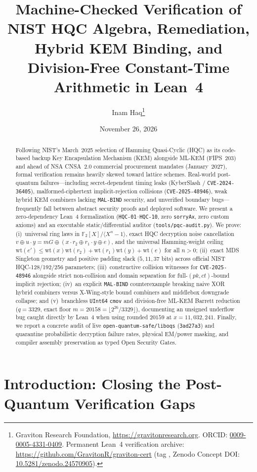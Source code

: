 \documentclass[11pt,a4paper]{article}
\title{\textbf{Machine-Checked Verification of NIST HQC Algebra, \code{CVE-2025-48946} Remediation, Hybrid KEM Binding, and Division-Free Constant-Time Arithmetic in Lean~4}}
\author{
  Inam Haq\thanks{Graviton Research Foundation, \url{https://gravitonresearch.org}. ORCID: \href{https://orcid.org/0009-0005-4331-0409}{0009-0005-4331-0409}. Permanent Lean~4 verification archive: \url{https://github.com/GravitonR/graviton-cert} (tag \code{v0.6.0}, Zenodo Concept DOI: \href{https://doi.org/10.5281/zenodo.24570905}{10.5281/zenodo.24570905}).}
}
\date{November 26, 2026}
\theoremstyle{plain}
\theoremstyle{remark}
\newcommand{\code}[1]{\texttt{\small #1}}
\newcommand{\Ftwo}{\mathbb{F}_2}
\newcommand{\wt}{\mathrm{wt}}
\begin{document}
\maketitle

\begin{abstract}
Following NIST's March~2025 selection of Hamming Quasi-Cyclic (HQC) as its code-based backup Key Encapsulation Mechanism (KEM) alongside ML-KEM (FIPS~203) and ahead of NSA CNSA~2.0 commercial procurement mandates (January~2027), formal verification remains heavily skewed toward lattice schemes. Real-world post-quantum failures—including secret-dependent timing leaks (KyberSlash / \code{CVE-2024-36405}), malformed-ciphertext implicit-rejection collisions (\code{CVE-2025-48946}), weak hybrid KEM combiners lacking \code{MAL-BIND} security, and unverified boundary bugs—frequently fall between abstract security proofs and deployed software. We present a zero-dependency Lean~4 formalization (\code{HQC-01}--\code{HQC-10}, zero \code{sorryAx}, zero custom axioms) and an executable static/differential auditor (\code{tools/pqc-audit.py}). We prove: (i)~universal ring laws in $\Ftwo[X]/\langle X^n-1\rangle$, exact HQC decryption noise cancellation $v \oplus u\cdot y = mG \oplus (x\cdot r_2 \oplus r_1\cdot y \oplus e)$, and the universal Hamming-weight ceiling $\wt(e') \le \wt(x)\wt(r_2) + \wt(r_1)\wt(y) + \wt(e)$ for all $n>0$; (ii)~exact MDS Singleton geometry and positive padding slack ($5, 11, 37$ bits) across official NIST HQC-128/192/256 parameters; (iii)~constructive collision witnesses for \code{CVE-2025-48946} alongside strict non-collision and domain separation for full-$(pk,ct)$-bound implicit rejection; (iv)~an explicit \code{MAL-BIND} counterexample breaking naive XOR hybrid combiners versus X-Wing-style bound combiners and middlebox downgrade collapse; and (v)~branchless \code{UInt64} \code{cmov} and division-free ML-KEM Barrett reduction ($q=3329$, exact floor $m=20158=\lfloor 2^{26}/3329\rfloor$), documenting an unsigned underflow bug caught directly by Lean~4 when using rounded $20159$ at $x=11{,}032{,}241$. Finally, we report a concrete audit of live \code{open-quantum-safe/liboqs} (\code{3ad27a3}) and quarantine probabilistic decryption failure rates, physical EM/power masking, and compiler assembly preservation as typed Open Security Gates.
\end{abstract}

\tableofcontents
\bigskip

\section{Introduction: Closing the Post-Quantum Verification Gaps}
\end{document}
